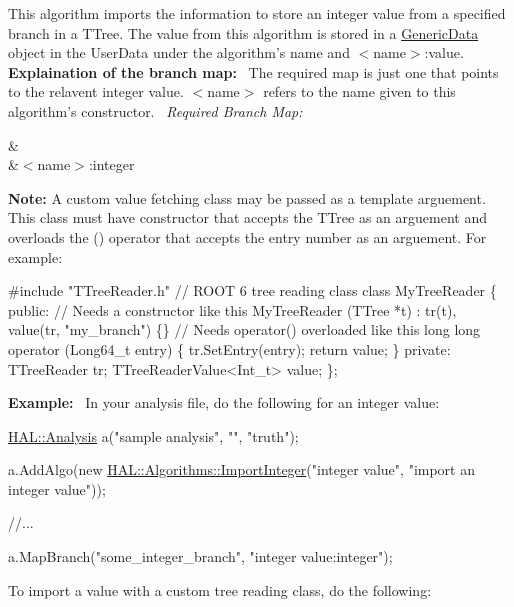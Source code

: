 This algorithm imports the information to store an integer value from a specified branch in a T\+Tree. The value from this algorithm is stored in a \hyperlink{class_h_a_l_1_1_generic_data}{Generic\+Data} object in the User\+Data under the algorithm's name and $<$name$>$\+:value.~\newline
~\newline
{\bfseries Explaination of the branch map\+:}~\newline
The required map is just one that points to the relavent integer value. $<$name$>$ refers to the name given to this algorithm's constructor.~\newline
{\itshape Required Branch Map\+:} \begin{TabularC}{2}
\hline
{}&\PBS{}\\
&\PBS\centering $<$name$>$\+:integer \\
\end{TabularC}
{\bfseries Note\+:} A custom value fetching class may be passed as a template arguement. This class must have constructor that accepts the T\+Tree as an arguement and overloads the () operator that accepts the entry number as an arguement. For example\+: 
\begin{DoxyCode}
\textcolor{preprocessor}{#include "TTreeReader.h"} \textcolor{comment}{// ROOT 6 tree reading class}
\textcolor{keyword}{class }MyTreeReader \{
\textcolor{keyword}{public}:
 \textcolor{comment}{// Needs a constructor like this}
 MyTreeReader (TTree *t) : tr(t), value(tr, \textcolor{stringliteral}{"my\_branch"}) \{\}
 \textcolor{comment}{// Needs operator() overloaded like this}
 \textcolor{keywordtype}{long} \textcolor{keywordtype}{long} operator (Long64\_t entry) \{
   tr.SetEntry(entry);
   \textcolor{keywordflow}{return} value;
 \}
\textcolor{keyword}{private}:
 TTreeReader tr;
 TTreeReaderValue<Int\_t> value;
\};
\end{DoxyCode}
 {\bfseries Example\+:}~\newline
In your analysis file, do the following for an integer value\+:


\begin{DoxyCode}
\hyperlink{class_h_a_l_1_1_analysis}{HAL::Analysis} a(\textcolor{stringliteral}{"sample analysis"}, \textcolor{stringliteral}{""}, \textcolor{stringliteral}{"truth"});

a.AddAlgo(\textcolor{keyword}{new} \hyperlink{class_h_a_l_1_1_algorithms_1_1_import_integer_value}{HAL::Algorithms::ImportInteger}(\textcolor{stringliteral}{"integer value"}, \textcolor{stringliteral}{"import an
       integer value"}));

\textcolor{comment}{//...}

a.MapBranch(\textcolor{stringliteral}{"some\_integer\_branch"}, \textcolor{stringliteral}{"integer value:integer"});
\end{DoxyCode}
 To import a value with a custom tree reading class, do the following\+:


